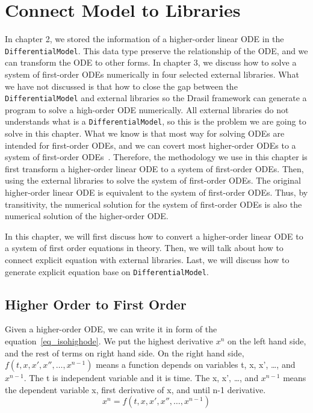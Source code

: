 \chapter{Connect Model to Libraries}
In chapter 2, we stored the information of a higher-order linear ODE in the \verb|DifferentialModel|. This data type preserve the relationship of the ODE, and we can transform the ODE to other forms. In chapter 3, we discuss how to solve a system of first-order ODEs numerically in four selected external libraries. What we have not discussed is that how to close the gap between the \verb|DifferentialModel| and external libraries so the Drasil framework can generate a program to solve a high-order ODE numerically. All external libraries do not understands what is a \verb|DifferentialModel|, so this is the problem we are going to solve in this chapter. What we know is that most way for solving ODEs are intended for first-order ODEs, and we can covert most higher-order ODEs to a system of first-order ODEs~\citep{converthigherode}. Therefore, the methodology we use in this chapter is first transform a higher-order linear ODE to a system of first-order ODEs. Then, using the external libraries to solve the system of first-order ODEs. The original higher-order linear ODE is equivalent to the system of first-order ODEs. Thus, by transitivity, the numerical solution for the system of first-order ODEs is also the numerical solution of the higher-order ODE.

In this chapter, we will first discuss how to convert a higher-order linear ODE to a system of first order equations in theory. Then, we will talk about how to connect explicit equation with external libraries. Last, we will discuss how to generate explicit equation base on \verb|DifferentialModel|.

\section{Higher Order to First Order}
\label{se_hightofirst}
Given a higher-order ODE, we can write it in form of the equation~\ref{eq_isohighode}. We put the highest derivative $x^n$ on the left hand side, and the rest of terms on right hand side. On the right hand side, $f (t, x, x', x'', \dots, x^{n-1})$ means a function depends on variables t, x, x', \dots, and $x^{n-1}$. The t is independent variable and it is time. The x, x', \dots, and $x^{n-1}$ means the dependent variable x, first derivative of x, and until n-1 derivative.
\begin{equation} \label{eq_isohighode}
  x^n = f (t, x, x', x'', \dots, x^{n-1})
\end{equation}


